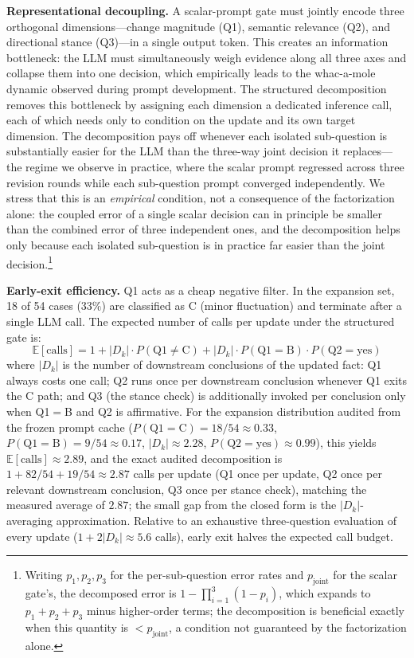 \documentclass{article}
\theoremstyle{definition}
\begin{document}
\textbf{Representational decoupling.}  A scalar-prompt gate must
jointly encode three orthogonal dimensions---change magnitude (Q1),
semantic relevance (Q2), and directional stance (Q3)---in a single
output token.  This creates an information bottleneck: the LLM must
simultaneously weigh evidence along all three axes and collapse them
into one decision, which empirically leads to the whac-a-mole dynamic
observed during prompt development.  The structured
decomposition removes this bottleneck by assigning each dimension a
dedicated inference call, each of which needs only to condition on the
update and its own target dimension.  The decomposition pays off
whenever each isolated sub-question is substantially easier for the LLM
than the three-way joint decision it replaces---the regime we observe in
practice, where the scalar prompt regressed
across three revision rounds while each sub-question prompt converged
independently.  We stress that this is an \emph{empirical} condition, not
a consequence of the factorization alone: the coupled error of a single
scalar decision can in principle be smaller than the combined error of
three independent ones, and the decomposition helps only because each
isolated sub-question is in practice far easier than the joint
decision.\footnote{Writing $p_1,p_2,p_3$ for the per-sub-question error
rates and $p_{\text{joint}}$ for the scalar gate's, the decomposed error
is $1-\prod_{i=1}^{3}(1-p_i)$, which expands to $p_1+p_2+p_3$ minus
higher-order terms; the decomposition is beneficial exactly when this
quantity is $<p_{\text{joint}}$, a condition not guaranteed by the
factorization alone.}

\textbf{Early-exit efficiency.}  Q1 acts as a cheap negative filter.
In the expansion set, 18 of 54 cases ($33\%$) are classified as C
(minor fluctuation) and terminate after a single LLM call.  The
expected number of calls per update under the structured gate is:
\[
\mathbb{E}[\text{calls}] = 1 +
|D_k|\cdot P(\text{Q1}\neq\text{C}) +
|D_k|\cdot P(\text{Q1}=\text{B})\cdot P(\text{Q2}=\text{yes})
\]
where $|D_k|$ is the number of downstream conclusions of the updated
fact: Q1 always costs one call; Q2 runs once per downstream conclusion
whenever Q1 exits the C path; and Q3 (the stance check) is additionally
invoked per conclusion only when Q1$=$B and Q2 is affirmative.  For the
expansion distribution audited from the frozen prompt cache
($P(\text{Q1}=\text{C})=18/54\approx 0.33$,
$P(\text{Q1}=\text{B})=9/54\approx 0.17$, $|D_k|\approx 2.28$,
$P(\text{Q2}=\text{yes})\approx 0.99$), this yields
$\mathbb{E}[\text{calls}]\approx 2.89$, and the exact audited decomposition
is $1+82/54+19/54\approx 2.87$ calls per update (Q1 once per update, Q2 once
per relevant downstream conclusion, Q3 once per stance check), matching the
measured average of $2.87$; the small gap from the closed form is the
$|D_k|$-averaging approximation.  Relative to an exhaustive three-question
evaluation of every update ($1+2|D_k|\approx 5.6$ calls), early exit
halves the expected call budget.
\end{document}
